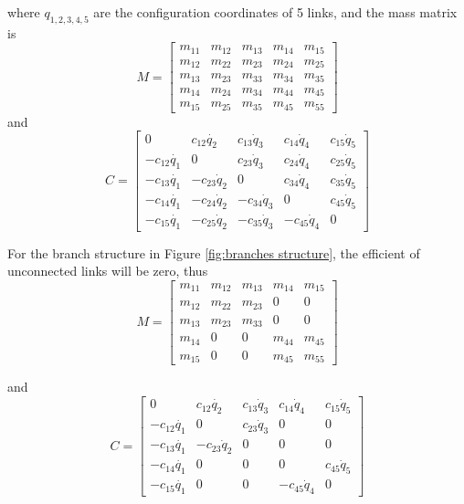 {where $q_{1,2,3,4,5}$ are the configuration coordinates of 5 links,
and the mass matrix is
\[
M=\left[\begin{array}{ccccc}
m_{11} & m_{12} & m_{13} & m_{14} & m_{15}\\
m_{12} & m_{22} & m_{23} & m_{24} & m_{25}\\
m_{13} & m_{23} & m_{33} & m_{34} & m_{35}\\
m_{14} & m_{24} & m_{34} & m_{44} & m_{45}\\
m_{15} & m_{25} & m_{35} & m_{45} & m_{55}\end{array}\right]
\]
and
\[
C=\left[\begin{array}{ccccc}
0 & c_{12}\dot{q_{2}} & c_{13}\dot{q}_{3} & c_{14}\dot{q}_{4} & c_{15}\dot{q}_{5}\\
-c_{12}\dot{q_{1}} & 0 & c_{23}\dot{q}_{3} & c_{24}\dot{q}_{4} & c_{25}\dot{q}_{5}\\
-c_{13}\dot{q_{1}} & -c_{23}\dot{q}_{2} & 0 & c_{34}\dot{q}_{4} & c_{35}\dot{q}_{5}\\
-c_{14}\dot{q_{1}} & -c_{24}\dot{q}_{2} & -c_{34}\dot{q}_{3} & 0 & c_{45}\dot{q}_{5}\\
-c_{15}\dot{q_{1}} & -c_{25}\dot{q}_{2} & -c_{35}\dot{q}_{3} & -c_{45}\dot{q}_{4} & 0\end{array}\right]
\]





For the branch structure in Figure \ref{fig:branches structure},
the efficient of unconnected links will be zero, thus
\[
M=\left[\begin{array}{ccccc}
m_{11} & m_{12} & m_{13} & m_{14} & m_{15}\\
m_{12} & m_{22} & m_{23} & 0 & 0\\
m_{13} & m_{23} & m_{33} & 0 & 0\\
m_{14} & 0 & 0 & m_{44} & m_{45}\\
m_{15} & 0 & 0 & m_{45} & m_{55}\end{array}\right]
\]

and
\[
C=\left[\begin{array}{ccccc}
0 & c_{12}\dot{q_{2}} & c_{13}\dot{q}_{3} & c_{14}\dot{q}_{4} & c_{15}\dot{q}_{5}\\
-c_{12}\dot{q_{1}} & 0 & c_{23}\dot{q}_{3} & 0 & 0\\
-c_{13}\dot{q_{1}} & -c_{23}\dot{q}_{2} & 0 & 0 & 0\\
-c_{14}\dot{q_{1}} & 0 & 0 & 0 & c_{45}\dot{q}_{5}\\
-c_{15}\dot{q_{1}} & 0 & 0 & -c_{45}\dot{q}_{4} & 0\end{array}\right]
\]








}
